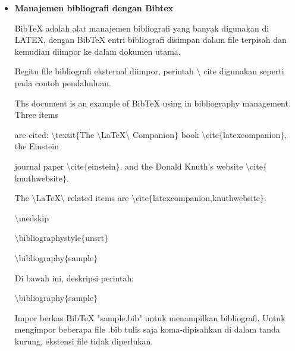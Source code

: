 \begin{itemize}
\vspace{12pt}
	\item {\fontsize{14pt}{14pt}\selectfont \textbf{Manajemen bibliografi dengan Bibtex}}\par

BibTeX adalah alat manajemen bibliografi yang banyak digunakan di LATEX, dengan BibTeX entri bibliografi disimpan dalam file terpisah dan kemudian diimpor ke dalam dokumen utama.\par

Begitu file bibliografi eksternal diimpor, perintah $\setminus$ cite digunakan seperti pada contoh pendahuluan.\par

\hspace*{0.5in}Ths document is an example of BibTeX using in bibliography management. Three items \par

are cited: $\setminus$textit$ \{ $The $\setminus$LaTeX$\setminus$ Companion$ \} $ book $\setminus$cite$ \{ $latexcompanion$ \} $, the Einstein\par

journal paper $\setminus$cite$ \{ $einstein$ \} $, and the Donald Knuth's website $\setminus$cite$ \{ $knuthwebsite$ \} $. \par

The $\setminus$LaTeX$\setminus$ related items are $\setminus$cite$ \{ $latexcompanion,knuthwebsite$ \} $. \par

\hspace*{0.5in}$\setminus$medskip \par

\hspace*{0.5in}$\setminus$bibliographystyle$ \{ $unsrt$ \} $\par

\hspace*{0.5in}$\setminus$bibliography$ \{ $sample$ \} $\par

Di bawah ini, deskripsi perintah:\par

$\setminus$bibliography$ \{ $sample$ \} $\par

\hspace*{0.5in}Impor berkas BibTeX "sample.bib" untuk menampilkan bibliografi. Untuk mengimpor beberapa file .bib tulis saja koma-dipisahkan di dalam tanda kurung, ekstensi file tidak diperlukan.\par


\end{itemize}

